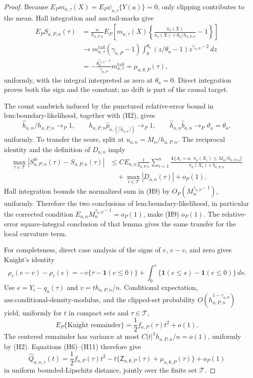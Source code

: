 \documentclass{article}
\begin{document}
\begin{proof}
Because \(E_Pm_{a,\tau}(X)=E_P\psi_{a,\tau}\{Y(a)\}=0\), only clipping contributes to the mean.  Hall integration and \(\text{ass:tail-marks}\) give
\[
\begin{split}
E_PS_{a,P,n}(\tau)
&=\frac n{h_{a,P,n}}E_P\!\left[m_{a,\tau}(X)
\left\{\frac{\pi_a(X)}{\pi_a(X)\vee\theta_a/h_{a,P,n}}-1\right\}\right]\\
&\longrightarrow m^{\mathrm{tail}}_{a,\tau}(\gamma_{a,P}-1)
\int_0^{\theta_a}(z/\theta_a-1)z^{\gamma_{a,P}-2}\,dz\\
&=-\frac{\theta_a^{\gamma_{a,P}-1}}{\gamma_{a,P}}
m^{\mathrm{tail}}_{a,\tau}=\mu_{a,\theta,P}(\tau),
\end{split}
\tag{H7}
\]
uniformly, with the integral interpreted as zero at \(\theta_a=0\).  Direct integration proves both the sign and the constant; no drift is part of the causal target.

The count sandwich induced by the punctured relative-error bound in \(\text{lem:boundary-likelihood}\), together with (H2), gives
\[
\widehat h_{a,n}/h_{a,P,n}\to_P1,
\qquad
h_{a,P,n}\widehat p_{a,(\lceil\widehat h_{a,n}\rceil)}\to_P1,
\qquad
\widehat h_{a,n}\widehat b_{a,n}\to_P\vartheta_a=\theta_a,
\tag{H8}
\]
uniformly.  To transfer the score, split at \(u_{a,n}=M_n/h_{a,P,n}\).  The reciprocal identity and the definition of \(D_{a,n}\) imply
\[
\begin{split}
\max_{\tau\in\mathcal T}|S^{\mathrm{fe}}_{a,P,n}(\tau)-S_{a,P,n}(\tau)|
&\le C E_{a,n}\frac1{h_{a,P,n}}\sum_{i=1}^n
\frac{\mathbf1\{A_i=a,\ \pi_a(X_i)\le M_n/h_{a,P,n}\}}
{\pi_a(X_i)\vee b_{a,P,n}}\\
&\quad+\max_{\tau\in\mathcal T}|D_{a,n}(\tau)|+o_P(1).
\end{split}
\tag{H9}
\]
Hall integration bounds the normalized sum in (H9) by \(O_P(M_n^{\gamma_{a,P}-1})\), uniformly.  Therefore the two conclusions of \(\text{lem:boundary-likelihood}\), in particular the corrected condition \(E_{a,n}M_n^{\gamma_{a,P}-1}=o_P(1)\), make (H9) \(o_P(1)\).  The relative-error square-integral conclusion of that lemma gives the same transfer for the local curvature term.

For completeness, direct case analysis of the signs of \(e\), \(e-v\), and zero gives Knight's identity
\[
\rho_\tau(e-v)-\rho_\tau(e)
=-v\{\tau-\mathbf1(e\le0)\}
+\int_0^v\{\mathbf1(e\le s)-\mathbf1(e\le0)\}\,ds.
\tag{H10}
\]
Use \(e=Y_i-q_a(\tau)\) and \(v=t h_{a,P,n}/n\).  Conditional expectation, \(\text{ass:conditional-density-modulus}\), and the clipped-set probability \(O(h_{a,P,n}^{1-\gamma_{a,P}})\) yield, uniformly for \(t\) in compact sets and \(\tau\in\mathcal T\),
\[
E_P\{\text{Knight remainder}\}=\frac12f_{a,P}(\tau)t^2+o(1).
\tag{H11}
\]
The centered remainder has variance at most \(C|t|^3h_{a,P,n}/n=o(1)\), uniformly by (H2).  Equations (H6)--(H11) therefore give
\[
\widehat Q_{a,n,\tau}(t)
=\frac12f_{a,P}(\tau)t^2
-t\{\mathsf Z_{a,\theta,P}(\tau)+\mu_{a,\theta,P}(\tau)\}+o_P(1)
\tag{H12}
\]
in uniform bounded-Lipschitz distance, jointly over the finite set \(\mathcal T\).


\end{proof}
\end{document}
